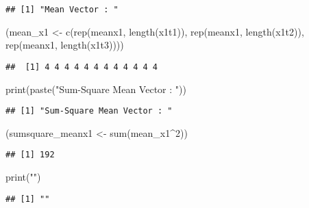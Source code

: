 \documentclass[
]{article}
\newenvironment{Shaded}{\begin{snugshade}}{\end{snugshade}}
\newcommand{\DecValTok}[1]{\textcolor[rgb]{0.00,0.00,0.81}{#1}}
\newcommand{\FunctionTok}[1]{\textcolor[rgb]{0.00,0.00,0.00}{#1}}
\newcommand{\NormalTok}[1]{#1}
\newcommand{\OtherTok}[1]{\textcolor[rgb]{0.56,0.35,0.01}{#1}}
\newcommand{\SpecialCharTok}[1]{\textcolor[rgb]{0.00,0.00,0.00}{#1}}
\newcommand{\StringTok}[1]{\textcolor[rgb]{0.31,0.60,0.02}{#1}}
\begin{document}
\begin{verbatim}
## [1] "Mean Vector : "
\end{verbatim}

\begin{Shaded}
\begin{Highlighting}[]
\NormalTok{(mean\_x1 }\OtherTok{\textless{}{-}} \FunctionTok{c}\NormalTok{(}\FunctionTok{rep}\NormalTok{(meanx1, }\FunctionTok{length}\NormalTok{(x1t1)), }
              \FunctionTok{rep}\NormalTok{(meanx1, }\FunctionTok{length}\NormalTok{(x1t2)), }
              \FunctionTok{rep}\NormalTok{(meanx1, }\FunctionTok{length}\NormalTok{(x1t3))))}
\end{Highlighting}
\end{Shaded}

\begin{verbatim}
##  [1] 4 4 4 4 4 4 4 4 4 4 4 4
\end{verbatim}

\begin{Shaded}
\begin{Highlighting}[]
\FunctionTok{print}\NormalTok{(}\FunctionTok{paste}\NormalTok{(}\StringTok{"Sum{-}Square Mean Vector : "}\NormalTok{))}
\end{Highlighting}
\end{Shaded}

\begin{verbatim}
## [1] "Sum-Square Mean Vector : "
\end{verbatim}

\begin{Shaded}
\begin{Highlighting}[]
\NormalTok{(sumsquare\_meanx1 }\OtherTok{\textless{}{-}} \FunctionTok{sum}\NormalTok{(mean\_x1}\SpecialCharTok{\^{}}\DecValTok{2}\NormalTok{)) }
\end{Highlighting}
\end{Shaded}

\begin{verbatim}
## [1] 192
\end{verbatim}

\begin{Shaded}
\begin{Highlighting}[]
\FunctionTok{print}\NormalTok{(}\StringTok{""}\NormalTok{)}
\end{Highlighting}
\end{Shaded}

\begin{verbatim}
## [1] ""
\end{verbatim}
\end{document}
